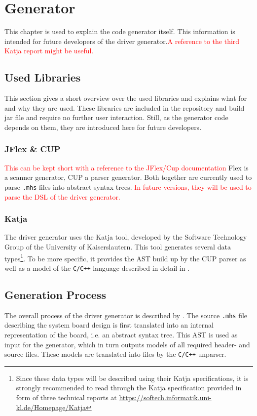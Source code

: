 \documentclass{report}
\begin{document}
\chapter{Generator}
This chapter is used to explain the code generator itself. This information is intended for future developers of the driver generator.\textcolor{red}{A reference to the third Katja report might be useful.}

\section{Used Libraries}
This section gives a short overview over the used libraries and explains what for and why they are used. These libraries are included in the repository and build jar file and require no further user interaction. Still, as the generator code depends on them, they are introduced here for future developers.

\subsection{JFlex \& CUP}
\textcolor{red}{This can be kept short with a reference to the JFlex/Cup documentation}
Flex is a scanner generator, CUP a parser generator. Both together are currently used to parse \texttt{.mhs} files into abstract syntax trees. \textcolor{red}{In future versions, they will be used to parse the DSL of the driver generator.}

\subsection{Katja}
The driver generator uses the Katja tool, developed by the Software Technology Group of the University of Kaiserslautern. This tool generates several data types\footnote{Since these data types will be described using their Katja specifications, it is strongly recommended to read through the Katja specification provided in form of three technical reports at \url{https://softech.informatik.uni-kl.de/Homepage/Katja}}. To be more specific, it provides the AST build up by the CUP parser as well as a model of the \texttt{C/C++} language described in detail in .

\section{Generation Process}
\label{sec:genprocess}
The overall process of the driver generator is described by . The source \texttt{.mhs} file describing the system board design is first translated into an internal representation of the board, i.e. an abstract syntax tree. This AST is used as input for the generator, which in turn outputs models of all required header- and source files. These models are translated into files by the \texttt{C/C++} unparser.
\end{document}

